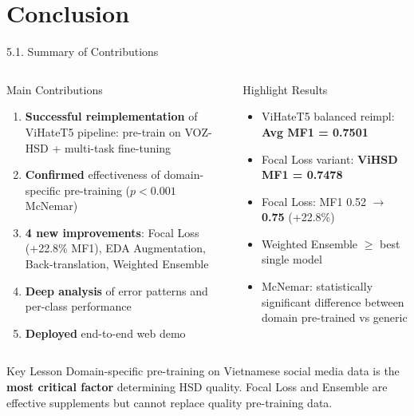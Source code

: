 \documentclass[11pt, aspectratio=169]{beamer}
\begin{document}
\section{Conclusion}

\begin{frame}[shrink=5]{5.1. Summary of Contributions}

\begin{columns}[T]
  \begin{block}{Main Contributions}
    \begin{enumerate}
      \item \textbf{Successful reimplementation} of ViHateT5 pipeline: pre-train on VOZ-HSD + multi-task fine-tuning
      \item \textbf{Confirmed} effectiveness of domain-specific pre-training ($p < 0.001$ McNemar)
      \item \textbf{4 new improvements}: Focal Loss (+22.8\% MF1), EDA Augmentation, Back-translation, Weighted Ensemble
      \item \textbf{Deep analysis} of error patterns and per-class performance
      \item \textbf{Deployed} end-to-end web demo
    \end{enumerate}
  \end{block}

  \begin{block}{Highlight Results}
    \begin{itemize}
      \item ViHateT5 balanced reimpl: \textbf{Avg MF1 = 0.7501}
      \item Focal Loss variant: \textbf{ViHSD MF1 = 0.7478}
      \item Focal Loss: MF1 0.52 $\rightarrow$ \textbf{0.75} (+22.8\%)
      \item Weighted Ensemble $\geq$ best single model
      \item McNemar: statistically significant difference between domain pre-trained vs generic
    \end{itemize}
  \end{block}
\end{columns}

\vspace{0.2cm}
\begin{block}{Key Lesson}
  Domain-specific pre-training on Vietnamese social media data is the \textbf{most critical factor} determining HSD quality. Focal Loss and Ensemble are effective supplements but cannot replace quality pre-training data.
\end{block}
\end{frame}
\end{document}
